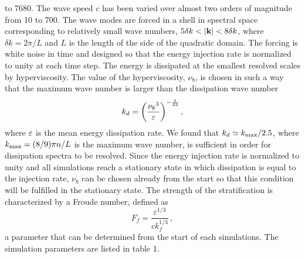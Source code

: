 to 7680.
%
The wave speed $c$ has been varied over almost two orders of magnitude from 10
to 700. The wave modes are forced in a shell in spectral space corresponding to
relatively small wave numbers, $ 5 \delta k < |\textbf{k}| < 8 \delta k$, where $
\delta k = 2 \pi /L $ and $ L $ is the length of the side of the quadratic
domain. The forcing is white noise in time and designed so that the energy
injection rate is normalized to unity at each time step. The energy is
dissipated at the smallest resolved scales by hyperviscosity. The value of the
hyperviscosity, $\nu_8$, is chosen in such a way that the maximum wave number
is larger than the dissipation wave number
\begin{equation}
k_{d} = \left( \frac{{\nu_8}^3}{\varepsilon} \right)^{-\frac{1}{22}},
\end{equation}
where $ \varepsilon $ is the mean energy dissipation rate. We found that $ k_{d}
\simeq \kmax/ 2.5$, where $\kmax = (8/9)\pi n/L $ is the maximum wave number,
is sufficient in order for dissipation spectra to be resolved. Since the energy
injection rate is normalized to unity and all simulations reach a stationary
state in which dissipation is equal to the injection rate, $ \nu_8 $ can be
chosen already from the start so that this condition will be fulfilled in the
stationary state. The strength of the stratification is characterized by a
Froude number, defined as
\begin{equation} \label{Fr}
F_f = \frac{\varepsilon^{1/3}}{c k_f^{1/3}} \, ,
\end{equation}
a parameter that can be determined from the start of each simulations.
The  simulation parameters are listed in table 1.


